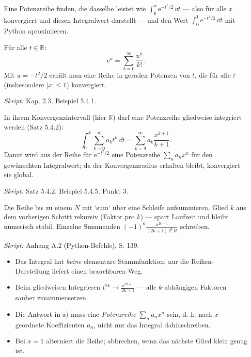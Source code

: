 

Eine Potenzreihe finden, die dasselbe leistet wie $\int_0^x \mathrm e^{-t^2/2}\,\dd t$
— also für alle $x$ konvergiert und diesen Integralwert darstellt — und den
Wert $\int_0^1\mathrm e^{-t^2/2}\,\dd t$ mit Python aproximieren.

\begin{werkzeugkasten}
Für alle $t\in\mathbb R$:
\begin{equation}
  \mathrm e^{u}=\sum_{k=0}^{\infty}\frac{u^k}{k!} .
\end{equation}
Mit $u=-t^2/2$ erhält man eine Reihe in geraden Potenzen von $t$, die für alle
$t$ (insbesondere $|x|\le 1$) konvergiert.

\textit{Skript:} Kap. 2.3, Beispiel 5.4.1.
\end{werkzeugkasten}

\begin{werkzeugkasten}
In ihrem Konvergenzintervall (hier $\mathbb R$) darf eine Potenzreihe
gliedweise integriert werden (Satz 5.4.2):
\begin{equation}
  \int_0^x \sum_{k=0}^{\infty}a_k t^k\,\dd t
  = \sum_{k=0}^{\infty}a_k\frac{x^{k+1}}{k+1}.
\end{equation}
Damit wird aus der Reihe für $\mathrm e^{-t^2/2}$ eine Potenzreihe
$\sum_n a_n x^n$ für den gewünschten Integralwert; da der Konvergenzradius
erhalten bleibt, konvergiert sie global.

\textit{Skript:} Satz 5.4.2, Beispiel 5.4.5, Punkt 3.
\end{werkzeugkasten}

\begin{werkzeugkasten}
Die Reihe bis zu einem $N$ mit `sum` über eine Schleife aufsummieren, Glied
$k$ aus dem vorherigen Schritt rekursiv (Faktor pro $k$) — spart Laufzeit und
bleibt numerisch stabil. Einzelne Summanden
$(-1)^k \frac{x^{2k+1}}{(2k+1)\,2^k\,k!}$ schreiben.

\textit{Skript:} Anhang A.2 (Python-Befehle), S. 139.
\end{werkzeugkasten}

\begin{achtung}
\begin{itemize}
  \item Das Integral hat \emph{keine} elementare Stammfunktion; nur die
        Reihen-Darstellung liefert einen brauchbaren Weg.
  \item Beim gliedweisen Integrieren $t^{2k}\to\frac{x^{2k+1}}{2k+1}$ — alle
        $k$-abhängigen Faktoren sauber zusammensetzen.
  \item Die Antwort in a) muss eine \emph{Potenzreihe} $\sum_n a_n x^n$ sein,
        d. h. nach $x$ geordnete Koeffizienten $a_n$, nicht nur das Integral
        dahinschreiben.
  \item Bei $x=1$ alterniert die Reihe; abbrechen, wenn das nächste Glied klein
        genug ist.
\end{itemize}
\end{achtung}
